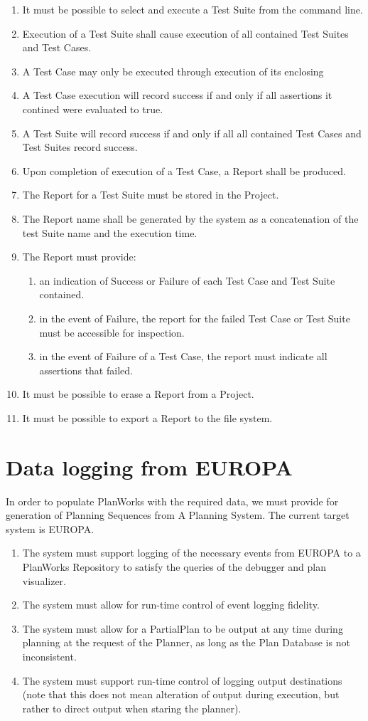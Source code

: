 \documentclass[twoside, 11pt]{article}
\begin{document}
\begin{enumerate}
\item It must be possible to select and execute a Test Suite from the command line.
\item Execution of a Test Suite shall cause execution of all contained Test Suites and Test Cases.
\item A Test Case may only be executed through execution of its enclosing
\item A Test Case execution will record success if and only if all assertions it contined were evaluated to true.
\item A Test Suite will record success if and only if all all contained Test Cases and Test Suites record success.
\item Upon completion of execution of a Test Case, a Report shall be produced.
\item The Report for a Test Suite must be stored in the Project.
\item The Report name shall be generated by the system as a concatenation of the test Suite name and the execution time.
\item The Report must provide:
\begin{enumerate}
\item an indication of Success or Failure of each Test Case and Test Suite contained.
\item in the event of Failure, the report for the failed Test Case or Test Suite must be accessible for inspection.
\item in the event of Failure of a Test Case, the report must indicate all assertions that failed.
\end{enumerate}
\item It must be possible to erase a Report from a Project.
\item It must be possible to export a Report to the file system.
\end{enumerate}

\section{Data logging from EUROPA}
In order to populate PlanWorks with the required data, we must provide for generation of Planning Sequences from A Planning System. The current target system is EUROPA.
\begin{enumerate}
\item The system must support logging of the necessary events from EUROPA to a PlanWorks Repository to satisfy the queries of the debugger and plan visualizer.
\item The system must allow for run-time control of event logging fidelity.
\item The system must allow for a PartialPlan to be output at any time during planning at the request of the Planner, as long as the Plan Database is not inconsistent.
\item The system must support run-time control of logging output destinations (note that this does not mean alteration of output during execution, but rather to direct output when staring the planner).
\end{enumerate}
\end{document}
